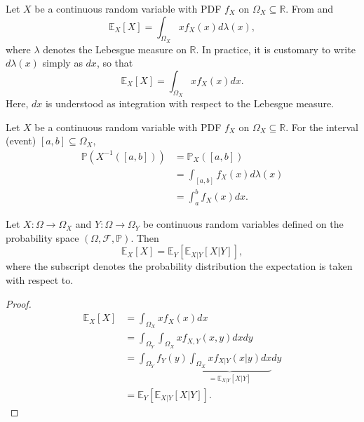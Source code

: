 \begin{remark}
	\label{remark:expectation_continuous}
	Let $X$ be a continuous random variable with PDF $f_X$ on $\Omega_X \subseteq \mathbb{R}$. From  and 	
	\begin{equation}
		\mathbb{E}_X[X] = \int_{\Omega_X} x f_X(x) d\lambda(x),
	\end{equation}
	where $\lambda$ denotes the Lebesgue measure on $\mathbb{R}$. 
	In practice, it is customary to write $d\lambda(x)$ simply as $dx$, so that
	\begin{equation}
		\mathbb{E}_X[X] = \int_{\Omega_X} x f_X(x) dx.
	\end{equation}
	Here, $dx$ is understood as integration with respect to the Lebesgue measure.
\end{remark}

\begin{example}
	Let $X$ be a continuous random variable with PDF $f_X$ on $\Omega_X\subseteq \mathbb{R}$. For the interval (event) $[a,b] \subseteq \Omega_X$,
	\begin{equation}
		\begin{split}
			\mathbb{P}(X^{-1}([a,b])) 
			&= \mathbb{P}_X([a,b])\\ 
			&= \int_{[a,b]} f_X(x) d\lambda(x)\\ 
			&= \int_a^b f_X(x) dx.
		\end{split}
	\end{equation}
\end{example}

\begin{theorem}
	\label{theorem:total_expectation}
	Let $X: \Omega \to \Omega_X$ and $Y: \Omega \to \Omega_Y$ be continuous random variables defined on the probability space $(\Omega, \mathcal{F}, \mathbb{P})$. Then
	\begin{equation}
		\mathbb{E}_X[X] = \mathbb{E}_Y[\mathbb{E}_{X|Y}[X| Y]],
	\end{equation}
	where the subscript denotes the probability distribution the expectation is taken with respect to.
\end{theorem}
\begin{proof}
	\begin{equation}
		\begin{split}
			\mathbb{E}_X[X] &= \int_{\Omega_X} x f_X(x) dx\\
			& = \int_{\Omega_Y} \int_{\Omega_X} x f_{X,Y}(x,y) dx dy\\
			& =  \int_{\Omega_Y} f_Y(y) \underbrace{\int_{\Omega_X}x f_{X|Y}(x|y) dx}_{= \mathbb{E}_{X|Y}[X|Y]}dy\\
			& = \mathbb{E}_Y[\mathbb{E}_{X|Y}[X|Y]].
		\end{split}
	\end{equation}
\end{proof}

